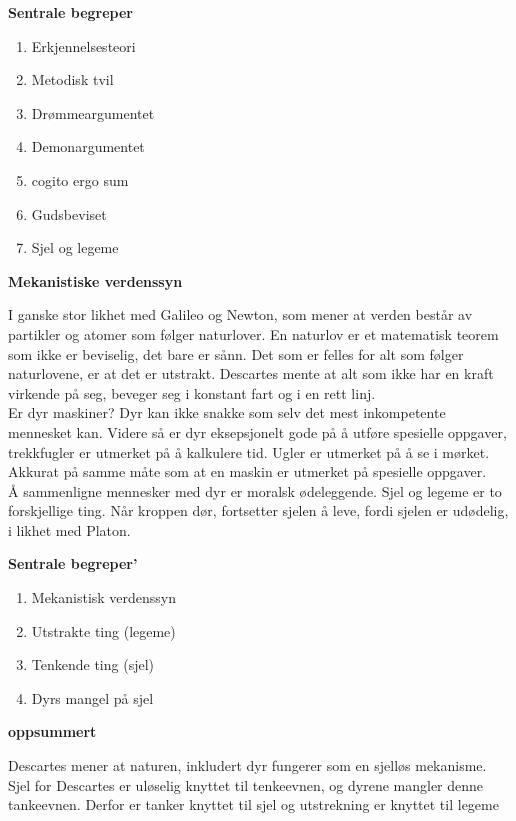 \documentclass[11pt, a4paper]{article}
\newenvironment{sectionbox}[1][]{%
    \begin{sectionboxinner}
    \textbf{\large #1}
    \vspace{1pt}
    \newline
}{%
    \end{sectionboxinner}
}
\begin{document}
\begin{sectionbox}[Sentrale begreper]
\begin{enumerate}
    \item Erkjennelsesteori
    \item Metodisk tvil
    \item Drømmeargumentet
    \item Demonargumentet
    \item cogito ergo sum
    \item Gudsbeviset
    \item Sjel og legeme
\end{enumerate}

\end{sectionbox}


\begin{sectionbox}[Mekanistiske verdenssyn]
I ganske stor likhet med Galileo og Newton, som mener at verden består av partikler og atomer som følger naturlover. En naturlov er et matematisk teorem som ikke er beviselig, det bare er sånn. Det som er felles for alt som følger naturlovene, er at det er utstrakt. Descartes mente at alt som ikke har en kraft virkende på seg, beveger seg i konstant fart og i en rett linj.\\

Er dyr maskiner? Dyr kan ikke snakke som selv det mest inkompetente mennesket kan. Videre så er dyr eksepsjonelt gode på å utføre spesielle oppgaver, trekkfugler er utmerket på å kalkulere tid. Ugler er utmerket på å se i mørket. Akkurat på samme måte som at en maskin er utmerket på spesielle oppgaver.\\


Å sammenligne mennesker med dyr er moralsk ødeleggende. Sjel og legeme er to forskjellige ting. Når kroppen dør, fortsetter sjelen å leve, fordi sjelen er udødelig, i likhet med Platon. 



\end{sectionbox}
\begin{sectionbox}[Sentrale begreper']
\begin{enumerate}
    \item Mekanistisk verdenssyn
    \item Utstrakte ting (legeme)
    \item Tenkende ting (sjel)
    \item Dyrs mangel på sjel
\end{enumerate}
\end{sectionbox}

\begin{sectionbox}[oppsummert]
Descartes mener at naturen, inkludert dyr fungerer som en sjelløs mekanisme. Sjel for Descartes er uløselig knyttet til tenkeevnen, og dyrene mangler denne tankeevnen. Derfor er tanker knyttet til sjel og utstrekning er knyttet til legeme

\end{sectionbox}
\end{document}
